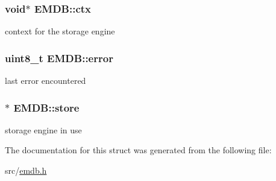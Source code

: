 \subsubsection[{ctx}]{\setlength{\rightskip}{0pt plus 5cm}void$\ast$ E\+M\+D\+B\+::ctx}\label{struct_e_m_d_b_a726fbe533f115c88e1afb228a9a19116}
context for the storage engine \hypertarget{struct_e_m_d_b_ae32927fa60a17d82bf46e33433054272}{}
\subsubsection[{error}]{\setlength{\rightskip}{0pt plus 5cm}uint8\+\_\+t E\+M\+D\+B\+::error}\label{struct_e_m_d_b_ae32927fa60a17d82bf46e33433054272}
last error encountered \hypertarget{struct_e_m_d_b_a872289fb194a97cf2718c680a7cee154}{}
\subsubsection[{store}]{$\ast$ E\+M\+D\+B\+::store}\label{struct_e_m_d_b_a872289fb194a97cf2718c680a7cee154}
storage engine in use 

The documentation for this struct was generated from the following file\+:\begin{DoxyCompactItemize}
\item 
src/\hyperlink{emdb_8h}{emdb.\+h}\end{DoxyCompactItemize}
